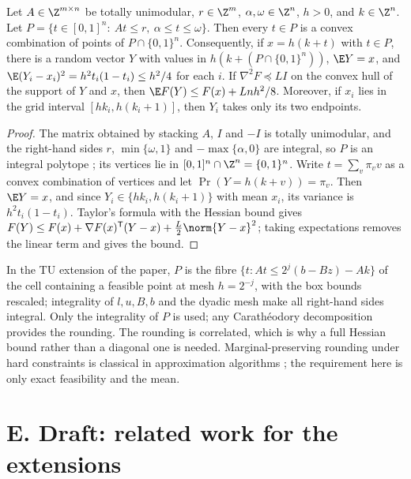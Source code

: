 \begin{lemma}\label{lit:lem:tu}
Let $A\in\Z^{m\times n}$ be totally unimodular, $r\in\Z^m$, $\alpha,\omega\in\Z^n$, $h>0$, and
$k\in\Z^n$. Let $P=\{t\in[0,1]^n:\ At\le r,\ \alpha\le t\le\omega\}$. Then every $t\in P$ is a
convex combination of points of $P\cap\{0,1\}^n$. Consequently, if $x=h(k+t)$ with $t\in P$,
there is a random vector $Y$ with values in $h(k+(P\cap\{0,1\}^n))$, $\E Y=x$, and
$\E(Y_i-x_i)^2=h^2t_i(1-t_i)\le h^2/4$ for each $i$. If $\nabla^2F\preceq LI$ on the convex hull
of the support of $Y$ and $x$, then $\E F(Y)\le F(x)+Lnh^2/8$. Moreover, if $x_i$ lies in the
grid interval $[hk_i,h(k_i+1)]$, then $Y_i$ takes only its two endpoints.
\end{lemma}

\begin{proof}
The matrix obtained by stacking $A$, $I$ and $-I$ is totally unimodular, and the right-hand
sides $r$, $\min\{\omega,1\}$ and $-\max\{\alpha,0\}$ are integral, so $P$ is an integral
polytope \cite{HoffmanKruskal1956}; its vertices lie in $[0,1]^n\cap\Z^n=\{0,1\}^n$. Write
$t=\sum_v\pi_vv$ as a convex combination of vertices and let $\Pr(Y=h(k+v))=\pi_v$. Then
$\E Y=x$, and since $Y_i\in\{hk_i,h(k_i+1)\}$ with mean $x_i$, its variance is
$h^2t_i(1-t_i)$. Taylor's formula with the Hessian bound gives
$F(Y)\le F(x)+\nabla F(x)^{\mathsf T}(Y-x)+\tfrac L2\norm{Y-x}^2$; taking expectations removes
the linear term and gives the bound.
\end{proof}

\begin{remark}
In the TU extension of the paper, $P$ is the fibre $\{t: At\le2^j(b-Bz)-Ak\}$ of the cell
containing a feasible point at mesh $h=2^{-j}$, with the box bounds rescaled; integrality of
$l,u,B,b$ and the dyadic mesh make all right-hand sides integral. Only the integrality of $P$ is
used; any Carath\'eodory decomposition provides the rounding. The rounding is correlated, which is
why a full Hessian bound rather than a diagonal one is needed. Marginal-preserving rounding under
hard constraints is classical in approximation algorithms
\cite{GandhiEtAl2006,ChekuriVondrakZenklusen2010}; the requirement here is only exact
feasibility and the mean.
\end{remark}

\section*{E. Draft: related work for the extensions}


